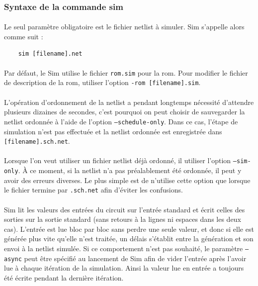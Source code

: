 \documentclass{article}
\begin{document}
\subsubsection{Syntaxe de la commande sim}
\paragraph{}Le seul paramètre obligatoire est le fichier netlist à simuler. Sim s'appelle
alors comme suit :
\begin{verbatim}
	sim [filename].net
\end{verbatim}

\paragraph{}Par défaut, le Sim utilise le fichier \texttt{rom.sim} pour la rom. Pour modifier le fichier de description de la rom, utiliser l'option \texttt{-rom [filename].sim}.

\paragraph{}L'opération d'ordonnement de la netlist a pendant longtemps nécessité d'attendre plusieurs dizaines de secondes, c'est pourquoi on peut choisir de sauvegarder la netlist ordonnée à l'aide de l'option \texttt{--schedule-only}. Dans ce cas, l'étape de simulation n'est pas effectuée et la netlist ordonnée est enregistrée dans \texttt{[filename].sch.net}.

\paragraph{}Lorsque l'on veut utiliser un fichier netlist déjà ordonné, il utiliser l'option \texttt{--sim-only}. À ce moment, si la netlist n'a pas préalablement été ordonnée, il peut y avoir des erreurs diverses. Le plus simple est de n'utilise cette option que lorsque le fichier termine par \texttt{.sch.net} afin d'éviter les confusions.

\paragraph{}Sim lit les valeurs des entrées du circuit sur l'entrée standard et écrit celles des sorties sur la sortie standard (sans retours à la lignes ni espaces dans les deux cas). L'entrée est lue bloc par bloc sans perdre une seule valeur, et donc si elle est générée plus vite qu'elle n'est traitée, un délais s'établit entre la génération et son envoi à la netlist simulée. Si ce comportement n'est pas souhaité, le paramètre \texttt{--async} peut être spécifié au lancement de Sim afin de vider l'entrée après l'avoir lue à chaque itération de la simulation. Ainsi la valeur lue en entrée a toujours été écrite pendant la dernière itération.
\end{document}
